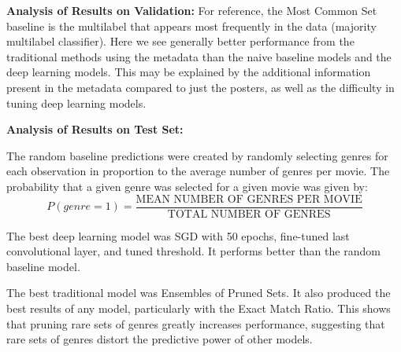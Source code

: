 \documentclass{article}
\begin{document}
    
    \textbf{Analysis of Results on Validation:}
    For reference, the Most Common Set baseline is the multilabel that appears most frequently in the data (majority multilabel classifier).
    Here we see generally better performance from the traditional methods using the metadata than the naive baseline models and the deep learning models.  This may be explained by the additional information present in the metadata compared to just the posters, as well as the difficulty in tuning deep learning models.
    
    \textbf{Analysis of Results on Test Set:}

    The random baseline predictions were created by randomly selecting genres for each observation in proportion to the average number of genres per movie. The probability that a given genre was selected for a given movie was given by:
    $$P(genre = 1) = \frac{\text{MEAN NUMBER OF GENRES PER MOVIE}}{\text{TOTAL NUMBER OF GENRES}}$$

    The best deep learning model was SGD with 50 epochs, fine-tuned last convolutional layer, and tuned threshold. It performs better than the random baseline model. 
    
    The best traditional model was Ensembles of Pruned Sets. It also produced the best results of any model, particularly with the Exact Match Ratio. This shows that pruning rare sets of genres greatly increases performance, suggesting that rare sets of genres distort the predictive power of other models. 
    
    
    
    
\end{document}
